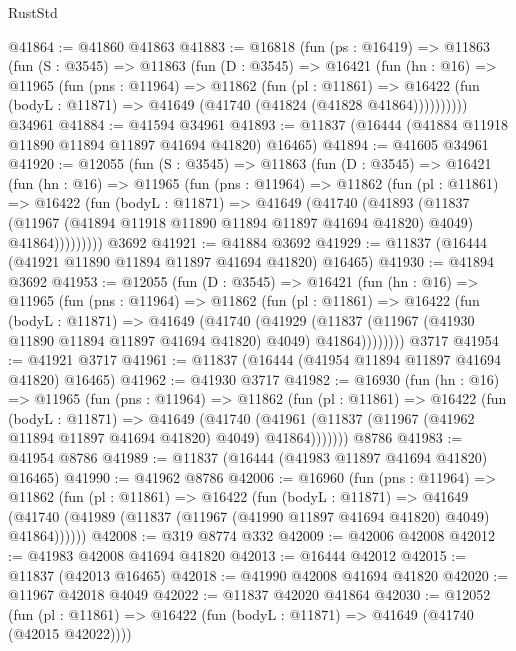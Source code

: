\begin{lexlean}{RustStd}
\begin{coremodule}
{\begin{coremodule}
{{{{{{{{{{{{{{{{{{{{{{{{{{{{{{{{{{{{{{{{{{{{{{{{{{@41864 := @41860 @41863
@41883 := @16818
    (fun (ps : @16419) =>
    @11863
      (fun (S : @3545) =>
      @11863
        (fun (D : @3545) =>
        @16421
          (fun (hn : @16) =>
          @11965
            (fun (pns : @11964) =>
            @11862
              (fun (pl : @11861) =>
              @16422 (fun (bodyL : @11871) => @41649 (@41740 (@41824 (@41828 @41864))))))))))
    @34961
@41884 := @41594 @34961
@41893 := @11837 (@16444 (@41884 @11918 @11890 @11894 @11897 @41694 @41820) @16465)
@41894 := @41605 @34961
@41920 := @12055
    (fun (S : @3545) =>
    @11863
      (fun (D : @3545) =>
      @16421
        (fun (hn : @16) =>
        @11965
          (fun (pns : @11964) =>
          @11862
            (fun (pl : @11861) =>
            @16422
              (fun (bodyL : @11871) =>
              @41649
                (@41740
                  (@41893
                    (@11837
                      (@11967 (@41894 @11918 @11890 @11894 @11897 @41694 @41820) @4049)
                      @41864)))))))))
    @3692
@41921 := @41884 @3692
@41929 := @11837 (@16444 (@41921 @11890 @11894 @11897 @41694 @41820) @16465)
@41930 := @41894 @3692
@41953 := @12055
    (fun (D : @3545) =>
    @16421
      (fun (hn : @16) =>
      @11965
        (fun (pns : @11964) =>
        @11862
          (fun (pl : @11861) =>
          @16422
            (fun (bodyL : @11871) =>
            @41649
              (@41740
                (@41929
                  (@11837 (@11967 (@41930 @11890 @11894 @11897 @41694 @41820) @4049) @41864))))))))
    @3717
@41954 := @41921 @3717
@41961 := @11837 (@16444 (@41954 @11894 @11897 @41694 @41820) @16465)
@41962 := @41930 @3717
@41982 := @16930
    (fun (hn : @16) =>
    @11965
      (fun (pns : @11964) =>
      @11862
        (fun (pl : @11861) =>
        @16422
          (fun (bodyL : @11871) =>
          @41649
            (@41740
              (@41961 (@11837 (@11967 (@41962 @11894 @11897 @41694 @41820) @4049) @41864)))))))
    @8786
@41983 := @41954 @8786
@41989 := @11837 (@16444 (@41983 @11897 @41694 @41820) @16465)
@41990 := @41962 @8786
@42006 := @16960
    (fun (pns : @11964) =>
    @11862
      (fun (pl : @11861) =>
      @16422
        (fun (bodyL : @11871) =>
        @41649 (@41740 (@41989 (@11837 (@11967 (@41990 @11897 @41694 @41820) @4049) @41864))))))
@42008 := @319 @8774 @332
@42009 := @42006 @42008
@42012 := @41983 @42008 @41694 @41820
@42013 := @16444 @42012
@42015 := @11837 (@42013 @16465)
@42018 := @41990 @42008 @41694 @41820
@42020 := @11967 @42018 @4049
@42022 := @11837 @42020 @41864
@42030 := @12052
    (fun (pl : @11861) => @16422 (fun (bodyL : @11871) => @41649 (@41740 (@42015 @42022))))
}}}}}}}}}}}}}}}}}}}}}}}}}}}}}}}}}}}}}}}}}}}}}}}}}}
\end{coremodule}}
\end{coremodule}
\end{lexlean}
